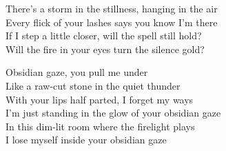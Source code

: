 \begin{lyrics}
There’s a storm in the stillness, hanging in the air\\
Every flick of your lashes says you know I’m there\\
If I step a little closer, will the spell still hold?\\
Will the fire in your eyes turn the silence gold?

Obsidian gaze, you pull me under\\
Like a raw-cut stone in the quiet thunder\\
With your lips half parted, I forget my ways\\
I’m just standing in the glow of your obsidian gaze\\
In this dim-lit room where the firelight plays\\
I lose myself inside your obsidian gaze
\end{lyrics}

